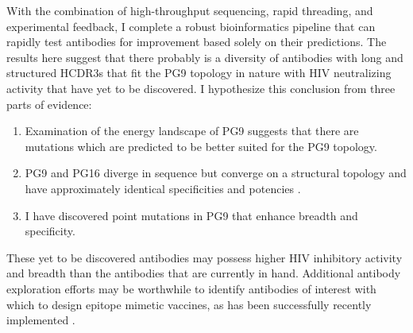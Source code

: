 With the combination of high-throughput sequencing, rapid threading, and experimental feedback, I complete a robust bioinformatics pipeline that can rapidly test antibodies for improvement based solely on their \silico predictions. The results here suggest that there probably is a diversity of antibodies with long and structured HCDR3s that fit the PG9 topology in nature with HIV neutralizing activity that have yet to be discovered. I hypothesize this conclusion from three parts of evidence:
\begin{enumerate}
\item Examination of the energy landscape of PG9 suggests that there are mutations which are predicted to be better suited for the PG9 topology.
\item PG9 and PG16 diverge in sequence but converge on a structural topology and have approximately identical specificities and potencies \citep{McLellan:2011dg,Pejchal:2010fp,Pancera:2010hh}.
\item I have discovered point mutations in PG9 that enhance breadth and specificity.
\end{enumerate}
These yet to be discovered antibodies may possess higher HIV inhibitory activity and breadth than the antibodies that are currently in hand. Additional antibody exploration efforts may be worthwhile to identify antibodies of interest with which to design epitope mimetic vaccines, as has been successfully recently implemented \citep{Correia:2014jp,Jardine:2013hb}.




